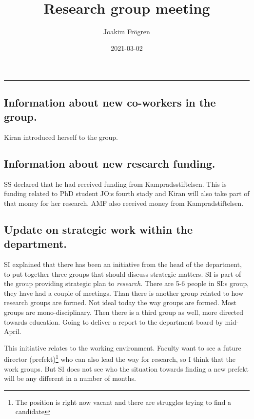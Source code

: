 \documentclass[
]{article}
\title{Research group meeting}
\author{Joakim Frögren}
\date{2021-03-02}
\begin{document}
\maketitle

\begin{center}\rule{0.5\linewidth}{0.5pt}\end{center}

\hypertarget{information-about-new-co-workers-in-the-group.}{%
\subsection{Information about new co-workers in the
group.}\label{information-about-new-co-workers-in-the-group.}}

Kiran introduced herself to the group.

\hypertarget{information-about-new-research-funding.}{%
\subsection{Information about new research
funding.}\label{information-about-new-research-funding.}}

SS declared that he had received funding from Kampradsstiftelsen. This
is funding related to PhD student JO:s fourth stady and Kiran will also
take part of that money for her research. AMF also received money from
Kampradstiftelsen.

\hypertarget{update-on-strategic-work-within-the-department.}{%
\subsection{Update on strategic work within the
department.}\label{update-on-strategic-work-within-the-department.}}

SI explained that there has been an initiative from the head of the
department, to put together three groups that should discuss strategic
matters. SI is part of the group providing strategic plan to
\emph{research}. There are 5-6 people in SI:s group, they have had a
couple of meetings. Than there is another group related to how research
groups are formed. Not ideal today the way groups are formed. Most
groups are mono-disciplinary. Then there is a third group as well, more
directed towards education. Going to deliver a report to the department
board by mid-April.

This initiative relates to the working environment. Faculty want to see
a future director (prefekt)\footnote{The position is right now vacant
  and there are struggles trying to find a candidate} who can also lead
the way for research, so I think that the work groups. But SI does not
see who the situation towards finding a new prefekt will be any
different in a number of months.
\end{document}
